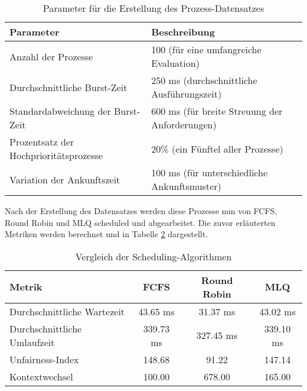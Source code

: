 \begin{table}[htbp]
	\centering
	\begin{tabular}{ll}
		\toprule
		Parameter                              & Beschreibung                                   \\
		\midrule
		Anzahl der Prozesse                    & 100 (für eine umfangreiche Evaluation)         \\
		Durchschnittliche Burst-Zeit           & 250 ms (durchschnittliche Ausführungszeit)     \\
		Standardabweichung der Burst-Zeit      & 600 ms (für breite Streuung der Anforderungen) \\
		Prozentsatz der Hochprioritätsprozesse & 20\% (ein Fünftel aller Prozesse)              \\
		Variation der Ankunftszeit             & 100 ms (für unterschiedliche Ankunftsmuster)   \\
		\bottomrule
	\end{tabular}
	\caption{Parameter für die Erstellung des Prozess-Datensatzes}
	\label{tab:process_dataset_parameters}
\end{table}

Nach der Erstellung des Datensatzes werden diese Prozesse nun von \ac{FCFS}, Round Robin und \ac{MLQ} scheduled und abgearbeitet. Die zuvor erläuterten Metriken werden berechnet und in Tabelle \ref{tab:scheduling_comparison} dargestellt.

\begin{table}[htbp]
	\centering
	\begin{tabular}{lccc}
		\toprule
		Metrik                       & FCFS      & Round Robin & MLQ       \\
		\midrule
		Durchschnittliche Wartezeit  & 43.65 ms  & 31.37 ms    & 43.02 ms  \\
		Durchschnittliche Umlaufzeit & 339.73 ms & 327.45 ms   & 339.10 ms \\
		Unfairness-Index             & 148.68    & 91.22       & 147.14    \\
		Kontextwechsel               & 100.00    & 678.00      & 165.00    \\
		\bottomrule
	\end{tabular}
	\caption{Vergleich der Scheduling-Algorithmen}
	\label{tab:scheduling_comparison}
\end{table}

